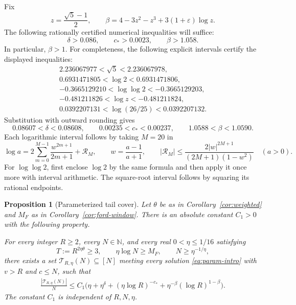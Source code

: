 \documentclass[11pt]{article}
\newtheorem{proposition}[theorem]{Proposition}
\theoremstyle{definition}
\theoremstyle{remark}
\numberwithin{equation}{section}
\newcommand{\N}{\mathbb N}
\newcommand{\eps}{\varepsilon}
\begin{document}
Fix
\begin{equation}\label{eq:z-beta}
 z=\frac{\sqrt5-1}{2},\qquad
 \beta=4-3z^2-z^3+3(1+\eps)\log z.
\end{equation}
The following rationally certified numerical inequalities will suffice:
\begin{equation}\label{eq:numeric}
 \delta>0.086,\qquad c_*>0.0023,\qquad \beta>1.058.
\end{equation}
In particular, \(\beta>1\). For completeness, the following explicit
intervals certify the displayed inequalities:
\[
\begin{gathered}
 2.236067977<\sqrt5<2.236067978,\\
 0.6931471805<\log2<0.6931471806,\\
 -0.3665129210<\log\log2<-0.3665129203,\\
 -0.481211826<\log z<-0.481211824,\\
 0.0392207131<\log(26/25)<0.0392207132.
\end{gathered}
\]
Substitution with outward rounding gives
\[
 0.08607<\delta<0.08608,\qquad
 0.00235<c_*<0.00237,\qquad
 1.0588<\beta<1.0590.
\]
Each logarithmic interval follows by taking \(M=20\) in
\[
 \log a=
 2\sum_{m=0}^{M-1}\frac{w^{2m+1}}{2m+1}
 +\mathcal R_M,\qquad
 w=\frac{a-1}{a+1},\qquad
 |\mathcal R_M|
 \le\frac{2|w|^{2M+1}}{(2M+1)(1-w^2)}
 \quad(a>0).
\]
For \(\log\log2\), first enclose \(\log2\) by the same formula
and then apply it once more with interval arithmetic. The square-root
interval follows by squaring its rational endpoints.

\begin{proposition}[Parameterized tail cover]\label{prop:param-cover}
Let \(\theta\) be as in Corollary~\ref{cor:weighted} and
\(M_F\) as in Corollary~\ref{cor:ford-window}. There is an absolute
constant \(C_1>0\) with the following property.

For every integer \(R\ge2\), every \(N\in\N\), and every real
\(0<\eta\le1/16\) satisfying
\begin{equation}\label{eq:cover-hypotheses}
 T:=R^{2\eta\theta}\ge3,\qquad
 \eta\log N\ge M_F,\qquad
 N\ge\eta^{-1/\eta},
\end{equation}
there exists a set \(\mathcal T_{R,\eta}(N)\subseteq[N]\)
meeting every solution \eqref{eq:param-intro} with \(v>R\) and
\(c\le N\), such that
\begin{align}
 \frac{|\mathcal T_{R,\eta}(N)|}{N}
 \le C_1\bigl(
   \eta+\eta^\delta
   +(\eta\log R)^{-c_*}
   +\eta^{-\beta}(\log R)^{1-\beta}
 \bigr).
 \label{eq:param-cover}
\end{align}
The constant \(C_1\) is independent of \(R,N,\eta\).
\end{proposition}
\end{document}
